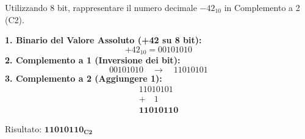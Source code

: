 \begin{Exercise}[label={ex:c2}]
    Utilizzando 8 bit, rappresentare il numero decimale $-42_{10}$ in Complemento a 2 (C2).
\end{Exercise}

\begin{Answer}[ref={ex:c2}]
    \textbf{1. Binario del Valore Assoluto (+42 su 8 bit):}
    \[ +42_{10} = 00101010 \]
    \textbf{2. Complemento a 1 (Inversione dei bit):}
    \[ 00101010 \quad \to \quad 11010101 \]
    \textbf{3. Complemento a 2 (Aggiungere 1):}
    \begin{align*}
        11010101 \\
        + \quad 1 \\
        \hline
        \mathbf{11010110}
    \end{align*}

    Risultato: $\mathbf{11010110_{C2}}$
\end{Answer}
